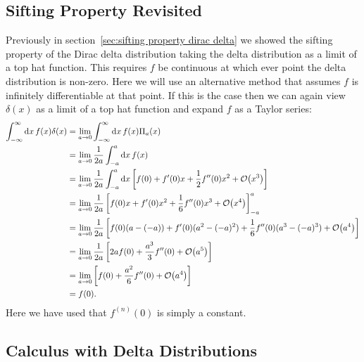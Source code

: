 \documentclass[a4paper]{article}
\begin{document}
    \subsection{Sifting Property Revisited}
    Previously in section~\ref{sec:sifting property dirac delta} we showed the sifting property of the Dirac delta distribution taking the delta distribution as a limit of a top hat function.
    This requires \(f\) be continuous at which ever point the delta distribution is non-zero.
    Here we will use an alternative method that assumes \(f\) is infinitely differentiable at that point.
    If this is the case then we can again view \(\delta(x)\) as a limit of a top hat function and expand \(f\) as a Taylor series:
    \begin{align*}
        \int_{-\infty}^{\infty} \dd{x} f(x)\delta(x) &= \lim_{a\to 0} \int_{-\infty}^{\infty} \dd{x} f(x)\Pi_a(x)\\
        &= \lim_{a\to 0} \frac{1}{2a} \int_{-a}^{a} \dd{x} f(x)\\
        &= \lim_{a\to 0} \frac{1}{2a} \int_{-a}^{a} \dd{x}\left[f(0) + f'(0)x + \frac{1}{2}f''(0)x^2 + \order{x^3}\right]\\
        &= \lim_{a\to 0} \frac{1}{2a} \left[f(0)x + f'(0)x^2 + \frac{1}{6}f''(0)x^3 + \order{x^4}\right]_{-a}^{a}\\
        &= \lim_{a\to 0} \frac{1}{2a} \left[f(0)(a - (-a)) + f'(0)(a^2 - (-a)^2) + \frac{1}{6}f''(0)(a^3 - (-a)^3) + \order{a^4}\right]\\
        &= \lim_{a\to 0} \frac{1}{2a} \left[2af(0) + \frac{a^3}{3}f''(0) + \order{a^5}\right]\\
        &= \lim_{a\to 0} \left[f(0) + \frac{a^2}{6}f''(0) + \order{a^4}\right]\\
        &= f(0).
    \end{align*}
    Here we have used that \(f^{(n)}(0)\) is simply a constant.
    
    \subsection{Calculus with Delta Distributions}
\end{document}
